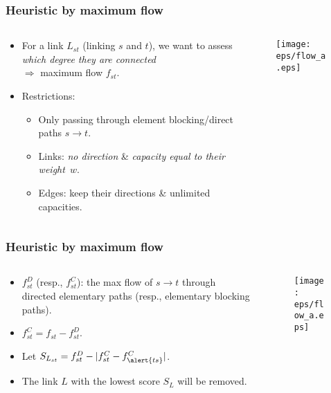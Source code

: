 \documentclass[xcolor=dvipsnames,envcountsect,handout]{beamer}
\begin{document}
\begin{frame}
\frametitle{Heuristic by maximum flow}
\vspace{-6pt}
\begin{columns}
\begin{column}[t]{6cm}
\begin{itemize}
\item For a link $L_{st}$ (linking $s$ and $t$), we want to assess
{\em which degree they are connected} \\
$\Rightarrow$ \alert{maximum flow} $f_{st}$. 
\vspace{5pt}
\item Restrictions: 
\begin{itemize}
\item Only passing through element blocking/direct paths $s\to t$.
\item Links: {\em no direction} \& {\em capacity equal to their
weight~$w$}. 
\item Edges: keep their directions \& unlimited capacities. 
\end{itemize}
\end{itemize}
\end{column}
\begin{column}[t]{6cm}
\vspace{-8pt}
\begin{figure}[H]
\centering
\texttt{[image: eps/flow\_a.eps]}
\end{figure}
\end{column}
\end{columns}
\end{frame}


\begin{frame}
\frametitle{Heuristic by maximum flow}
\vspace{-6pt}
\begin{columns}
\begin{column}[t]{6cm}
\begin{itemize}
\item $f_{st}^D$ (resp., $f_{st}^C$): the max flow of $s\to t$ through
directed elementary paths (resp., elementary blocking paths). 
\vspace{6pt}
\item $f_{st}^C = f_{st} - f_{st}^D$. 
\vspace{6pt}
\item Let $S_{L_{st}} = f^D_{st} - |f_{st}^C - f_{\alert{ts}}^C|$.
\vspace{6pt}
\item The link $L$ with the lowest score $S_L$ will be removed. 
\end{itemize}
\end{column}
\begin{column}[t]{6cm}
\vspace{-8pt}
\begin{figure}[H]
\centering
\texttt{[image: eps/flow\_a.eps]}
\end{figure}
\end{column}
\end{columns}
\end{frame}
\end{document}
